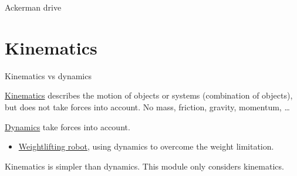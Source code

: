 \documentclass[compress]{beamer}
\begin{document}
\begin{frame}{Ackerman drive}

\end{frame}

\section{Kinematics}

\begin{frame}{Kinematics vs dynamics}

\href{http://en.wikipedia.org/wiki/Kinematics}{Kinematics} describes the
motion of objects or systems (combination of objects), but does not take
forces into account. No mass, friction, gravity, momentum, \ldots{}

\href{http://en.wikipedia.org/wiki/Analytical_dynamics}{Dynamics} take
forces into account.

\begin{itemize}
    \item \href{http://www.youtube.com/watch?v=kEed8DVO21I}{Weightlifting
  robot}, using dynamics to overcome the weight limitation.
\end{itemize}

Kinematics is simpler than dynamics. This module only considers
kinematics.

\end{frame}
\end{document}
